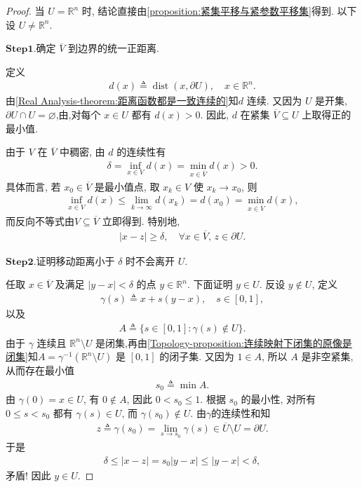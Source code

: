 \documentclass[../../main.tex]{subfiles}
\begin{document}
\begin{proof}
当 $U=\mathbb{R}^n$ 时, 结论直接由\cref{proposition:紧集平移与紧参数平移集}得到.
以下设 $U\neq\mathbb{R}^n$.

\noindent$\mathbf{Step}\bm{1}$.{\heiti 确定 $\overline{V}$ 到边界的统一正距离.}

定义
\begin{align*}
d(x)\triangleq\operatorname{dist}(x,\partial U),
\quad x\in\mathbb{R}^n.
\end{align*}
由\cref{Real Analysis-theorem:距离函数都是一致连续的}知$d$ 连续.
又因为 $U$ 是开集, $\partial U\cap U=\varnothing$,由,对每个 $x\in U$ 都有 $d(x)>0$.
因此, $d$ 在紧集 $\overline{V}\subseteq U$ 上取得正的最小值.

由于 $V$ 在 $\overline{V}$ 中稠密, 由 $d$ 的连续性有
\begin{align*}
\delta
=\inf\limits_{x\in V}d(x)
=\min\limits_{x\in\overline{V}}d(x)
>0.
\end{align*}
具体而言, 若 $x_0\in\overline{V}$ 是最小值点, 取 $x_k\in V$ 使 $x_k\to x_0$, 则
\begin{align*}
\inf\limits_{x\in V}d(x)
\leqslant
\lim\limits_{k\to\infty}d(x_k)
=d(x_0)
=\min\limits_{x\in\overline{V}}d(x),
\end{align*}
而反向不等式由$V\subseteq\overline{V}$ 立即得到.
特别地,
\begin{align*}
|x-z|\geqslant\delta,
\quad \forall x\in\overline{V},\, z\in\partial U.
\end{align*}

\noindent$\mathbf{Step}\bm{2}$.{\heiti 证明移动距离小于 $\delta$ 时不会离开 $U$.}

任取 $x\in\overline{V}$ 及满足 $|y-x|<\delta$ 的点 $y\in\mathbb{R}^n$.
下面证明 $y\in U$.
反设 $y\notin U$, 定义
\begin{align*}
\gamma(s)\triangleq x+s(y-x),
\quad s\in[0,1],
\end{align*}
以及
\begin{align*}
A\triangleq\{s\in[0,1]:\gamma(s)\notin U\}.
\end{align*}
由于 $\gamma$ 连续且 $\mathbb{R}^n\setminus U$ 是闭集,再由\cref{Topology-proposition:连续映射下闭集的原像是闭集}知$A=\gamma^{-1}(\mathbb{R}^n\setminus U)$ 是 $[0,1]$ 的闭子集.
又因为 $1\in A$, 所以 $A$ 是非空紧集, 从而存在最小值
\begin{align*}
s_0\triangleq\min A.
\end{align*}
由 $\gamma(0)=x\in U$, 有 $0\notin A$, 因此 $0<s_0\leqslant1$.
根据 $s_0$ 的最小性, 对所有 $0\leqslant s<s_0$ 都有 $\gamma(s)\in U$, 而 $\gamma(s_0)\notin U$.
由$\gamma$的连续性和知
\begin{align*}
z\triangleq\gamma(s_0)
=\lim\limits_{s\to s_0}\gamma(s)
\in\overline{U}\setminus U
=\partial U.
\end{align*}
于是
\begin{align*}
\delta
\leqslant|x-z|
=s_0|y-x|
\leqslant|y-x|
<\delta,
\end{align*}
矛盾!
因此 $y\in U$.


\end{proof}
\end{document}
